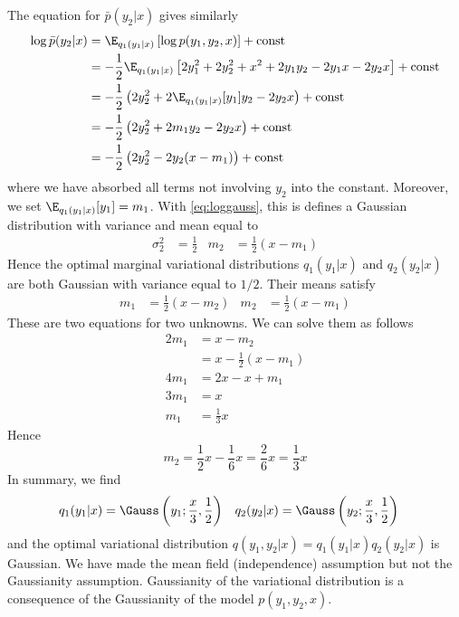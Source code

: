 \begin{exenumerate}
\begin{solution}
    The equation for $\bar{p}(y_2|x)$ gives similarly
    \begin{align}
      \log  \bar{p}(y_2|x) & =  \E_{q_1(y_1|x)}\left[ \log p(y_1, y_2, x)\right] + \text{const}\\
      & = -\frac{1}{2} \E_{q_1(y_1|x)}\left[  2 y_1^2 + 2 y_2^2 + x^2 + 2 y_1 y_2 - 2 y_1 x - 2y_2 x \right] + \text{const}\\
      & = -\frac{1}{2} \left(2 y_2^2 + 2 \E_{q_1(y_1|x)}[y_1] y_2 - 2y_2 x \right) + \text{const}\\
      & = -\frac{1}{2} \left(2 y_2^2 + 2 m_1 y_2 - 2 y_2 x \right) + \text{const}\\
      & = -\frac{1}{2} \left(2 y_2^2 - 2 y_2(x-m_1) \right) + \text{const}
      \label{eq:barp2}
    \end{align}
    where we have absorbed all terms not involving $y_2$ into the
    constant. Moreover, we set $\E_{q_1(y_1|x)}[y_1]=m_1$. With
    \eqref{eq:loggauss}, this is defines a Gaussian distribution with 
    variance and mean equal to
    \begin{align}
      \sigma_2^2 &= \frac{1}{2} & m_2 & = \frac{1}{2}(x-m_1)
    \end{align}
    Hence the optimal marginal variational distributions $q_1(y_1|x)$ and
    $q_2(y_2|x)$ are both Gaussian with variance equal to $1/2$. Their
    means satisfy
    \begin{align}
      m_1 & = \frac{1}{2}(x-m_2) & m_2  & = \frac{1}{2}(x-m_1)
    \end{align}
    These are two equations for two unknowns. We can solve them as follows   
    \begin{align}
      2 m_1 &= x - m_2 \\
      & = x -\frac{1}{2}(x-m_1)\\
      4 m_1 & = 2 x -x + m_1 \\
      3 m_1 & = x\\
      m_1 & = \frac{1}{3} x
    \end{align}
    Hence
    \begin{equation}
     m_2 = \frac{1}{2} x - \frac{1}{6} x = \frac{2}{6} x = \frac{1}{3} x
    \end{equation}
    In summary, we find
    \begin{align}
      q_1(y_1 | x) & = \Gauss\left(y_1; \frac{x}{3}, \frac{1}{2}\right) &  q_2(y_2 | x) & = \Gauss\left(y_2; \frac{x}{3}, \frac{1}{2}\right)
    \end{align}
    and the optimal variational distribution $q(y_1, y_2|x) =
    q_1(y_1|x) q_2(y_2|x)$ is Gaussian. We have made the mean field
    (independence) assumption but not the Gaussianity
    assumption. Gaussianity of the variational distribution is a
    consequence of the Gaussianity of the model $p(y_1, y_2, x)$.


\end{solution}
\end{exenumerate}
